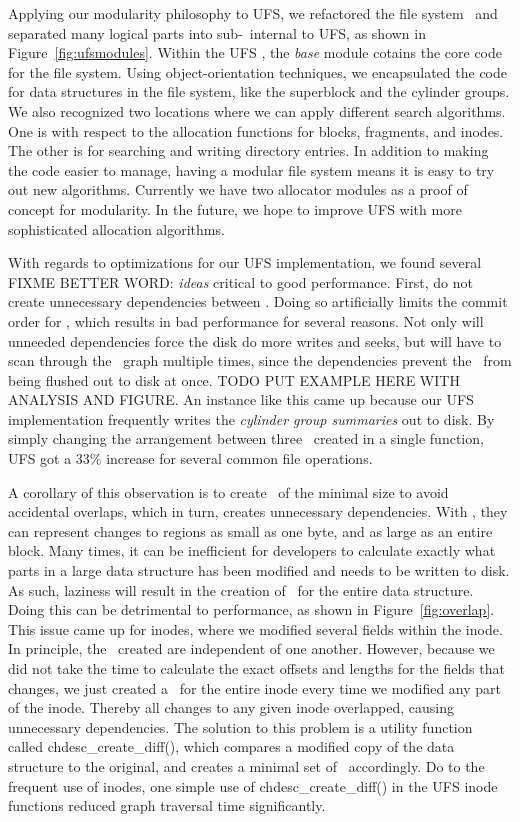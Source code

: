 Applying our modularity philosophy to UFS, we refactored the file system
\module\ and separated many logical parts into sub-\modules\ internal to UFS,
as shown in Figure~\ref{fig:ufsmodules}.
Within the UFS \module, the \emph{base} module cotains the core code for the
file system. Using object-orientation techniques, we encapsulated the code
for data structures in the file system, like the superblock and the cylinder
groups. We also recognized two locations where we can apply different
search algorithms. One is with respect to the allocation functions for blocks,
fragments, and inodes. The other is for searching and writing directory
entries. In addition to making the code easier to manage, having a modular
file system means it is easy to try out new algorithms. Currently we have
two allocator modules as a proof of concept for modularity. In the future,
we hope to improve UFS with more sophisticated allocation algorithms.

With regards to optimizations for our UFS implementation, we found several
FIXME BETTER WORD: \emph{ideas} critical to good performance. First, do not
create unnecessary dependencies between \chdescs. Doing so artificially limits
the commit order for \chdescs, which results in bad performance for several
reasons. Not only will unneeded dependencies force the disk do more writes and
seeks, but \Kudos will have to scan through the \chdesc\ graph
multiple times, since the dependencies prevent the \chdescs\ from being
flushed out to disk at once. TODO PUT EXAMPLE HERE WITH ANALYSIS AND FIGURE. 
An instance like this came up because our UFS implementation frequently writes
the \emph{cylinder group summaries} out to disk. By simply changing the
arrangement between three \chdescs\ created in a single function, UFS got a
33\% increase for several common file operations.

A corollary of this observation is to create \chdescs\ of the minimal size
to avoid accidental overlaps, which in turn, creates unnecessary dependencies.
With \chdescs, they can represent changes to regions as small as one byte, and
as large as an entire block. Many times, it can be inefficient for developers
to calculate exactly what parts in a large data structure has been modified and
needs to be written to disk. As such, laziness will result in the creation of
\chdescs\ for the entire data structure. Doing this can be detrimental to
performance, as shown in Figure~\ref{fig:overlap}. This issue came up for
inodes, where we modified several fields within the inode. In principle, the
\chdescs\ created are independent of one another. However, because we did not
take the time to calculate the exact offsets and lengths for the fields that
changes, we just created a \chdesc\ for the entire inode every time we modified
any part of the inode. Thereby all changes to any given inode overlapped,
causing unnecessary dependencies. The solution to this problem is a utility
function called chdesc\_create\_diff(), which compares a modified copy of the
data structure to the original, and creates a minimal set of \chdescs\ 
accordingly. Do to the frequent use of inodes, one simple use of
chdesc\_create\_diff() in the UFS inode functions reduced \chdescs graph
traversal time significantly.

